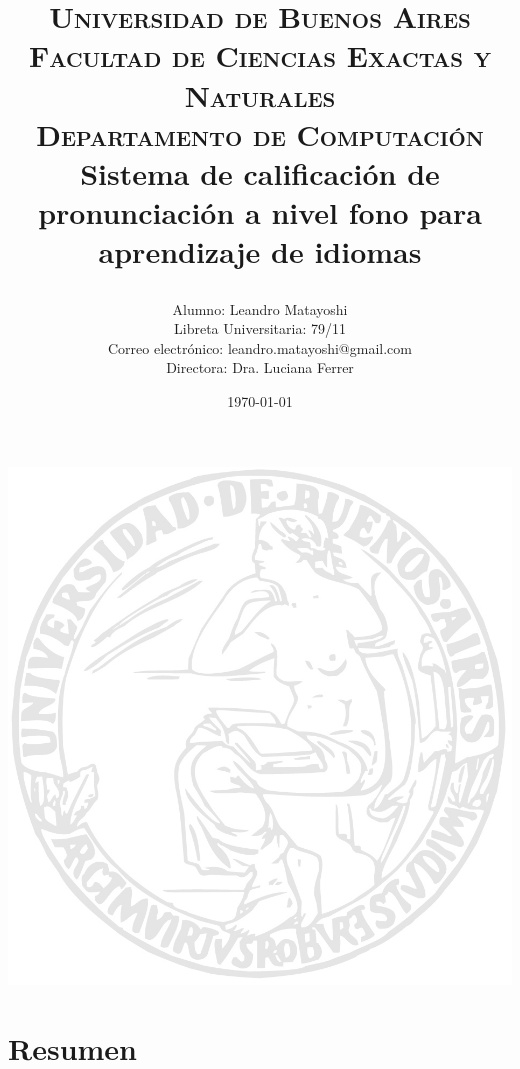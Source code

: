 \documentclass[a4paper,12pt]{article} %
\title{	
\normalfont \normalsize 
\textsc{Universidad de Buenos Aires \\ Facultad de Ciencias Exactas y Naturales \\ Departamento de Computaci\'on} \\ [25pt] %
\huge Sistema de calificación de pronunciación a nivel fono para aprendizaje de idiomas
\\ %
\date{\today}
\vspace{20px}
}
\author{
	Alumno: Leandro Matayoshi \\ 
	Libreta Universitaria: 79/11 \\ 
	Correo electr\'onico: leandro.matayoshi@gmail.com \\ 
	Directora: Dra. Luciana Ferrer
	\vspace{10px}
}
\begin{document}

\begin{titlepage}
\maketitle
\vspace{20px}
\begin{minipage}[t]{\textwidth}
    \begin{minipage}[t]{0.55 \textwidth}
        \includegraphics[scale=0.85]{logo_uba.jpg}
    \end{minipage}%
\end{minipage}%
\end{titlepage}


\section{Resumen}
\end{document}
